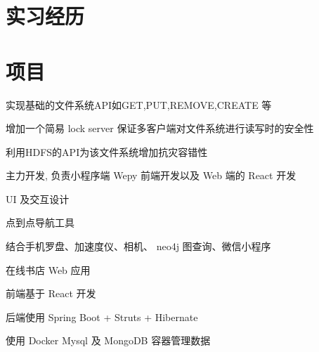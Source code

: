 \documentclass[]{deedy-resume-openfont}
\begin{document}
\begin{minipage}[t]{0.68\textwidth} 


\section{实习经历}
\sectionsep


\sectionsep


\section{项目}
\sectionsep

\descript{}
\vspace{\topsep}
\begin{tightemize}
    \item 实现基础的文件系统API如GET,PUT,REMOVE,CREATE 等
    \item 增加一个简易 lock server 保证多客户端对文件系统进行读写时的安全性
    \item 利用HDFS的API为该文件系统增加抗灾容错性
\end{tightemize}
\sectionsep

\begin{tightemize}
    \item 主力开发, 负责小程序端 Wepy 前端开发以及 Web 端的 React 开发
    \item UI 及交互设计
    \item 点到点导航工具
    \item 结合手机罗盘、加速度仪、相机、 neo4j 图查询、微信小程序
\end{tightemize}
\sectionsep

\descript{}
\begin{tightemize}
    \item 在线书店 Web 应用
    \item 前端基于 React 开发
    \item 后端使用 Spring Boot + Struts + Hibernate
    \item 使用 Docker Mysql 及 MongoDB 容器管理数据
\end{tightemize}
\sectionsep


\end{minipage}
\end{document}
